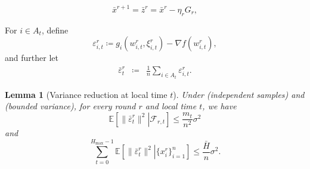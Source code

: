 \documentclass[10pt,a4paper]{amsart}
\newtheorem{lemma}{Lemma}
\newcommand{\ExpCond}[2]{{\mathbb{E}}\left[\left.#1\right\vert#2\right]}
\newcommand{\cF}{\mathcal{F}}
\newcommand{\eqdef}{\coloneqq}
\begin{document}
\begin{equation}
\bar x^{r+1}=\bar z^r = \bar x^r-\eta_r G_r,
\end{equation}

For \(i\in A_t\), define \begin{equation} \label{eq:-0-89u09980gf_0fgg}
\varepsilon_{i,t}^r
\eqdef
g_i(w_{i,t}^r,\xi_{i,t}^r)-\nabla f(w_{i,t}^r),
\end{equation}
and further let
\begin{eqnarray}
\bar\varepsilon_t^r
& \eqdef &  \frac{1}{n}\sum_{i\in A_t} \varepsilon_{i,t}^r. 
\label{eq:-8-f9d--08g} 
\end{eqnarray}

\begin{lemma}[Variance reduction at local time \(t\)]
\label{lem:variance_reduction}Under  (independent samples) and  (bounded variance), for every round \(r\) and local time \(t\), we have
\[
\ExpCond{\|\bar\varepsilon_t^r\|^2}{\cF_{r,t}}
\le
\frac{m_t}{n^2}\sigma^2
\]
and
\[
\sum_{t=0}^{H_{\max}-1}
\ExpCond{\|\bar\varepsilon_t^r\|^2}{\{x_i^r\}_{i=1}^n}
\le
\frac{\bar H}{n}\sigma^2.
\]
\end{lemma}
\end{document}
